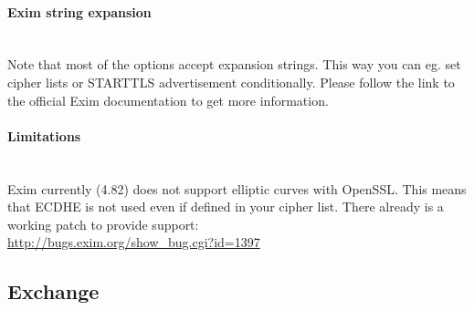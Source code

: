\paragraph*{Exim string expansion}\mbox{}\\

Note that most of the options accept expansion strings. This way you can eg. set cipher lists or STARTTLS advertisement conditionally. Please follow the link to the official Exim documentation to get more information.

\paragraph*{Limitations}\mbox{}\\

Exim currently (4.82) does not support elliptic curves with OpenSSL. This means that ECDHE is not used even if defined in your cipher list.
There already is a working patch to provide support:\\
\url{http://bugs.exim.org/show_bug.cgi?id=1397}



\subsection{Exchange}




